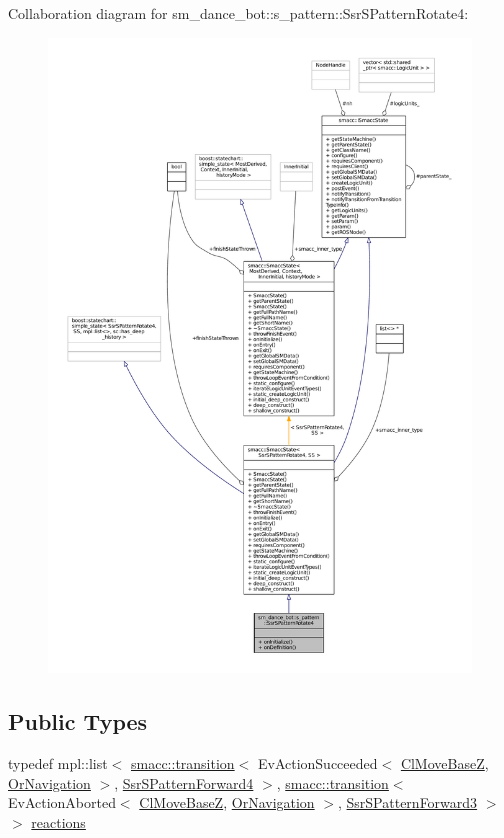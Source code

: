 Collaboration diagram for sm\+\_\+dance\+\_\+bot\+:\+:s\+\_\+pattern\+:\+:Ssr\+S\+Pattern\+Rotate4\+:
\nopagebreak
\begin{figure}[H]
\begin{center}
\leavevmode
\includegraphics[width=350pt]{structsm__dance__bot_1_1s__pattern_1_1SsrSPatternRotate4__coll__graph}
\end{center}
\end{figure}
\subsection*{Public Types}
\begin{DoxyCompactItemize}
\item 
typedef mpl\+::list$<$ \hyperlink{classsmacc_1_1transition}{smacc\+::transition}$<$ Ev\+Action\+Succeeded$<$ \hyperlink{classmove__base__z__client_1_1ClMoveBaseZ}{Cl\+Move\+BaseZ}, \hyperlink{classsm__dance__bot_1_1OrNavigation}{Or\+Navigation} $>$, \hyperlink{structsm__dance__bot_1_1s__pattern_1_1SsrSPatternForward4}{Ssr\+S\+Pattern\+Forward4} $>$, \hyperlink{classsmacc_1_1transition}{smacc\+::transition}$<$ Ev\+Action\+Aborted$<$ \hyperlink{classmove__base__z__client_1_1ClMoveBaseZ}{Cl\+Move\+BaseZ}, \hyperlink{classsm__dance__bot_1_1OrNavigation}{Or\+Navigation} $>$, \hyperlink{structsm__dance__bot_1_1s__pattern_1_1SsrSPatternForward3}{Ssr\+S\+Pattern\+Forward3} $>$ $>$ \hyperlink{structsm__dance__bot_1_1s__pattern_1_1SsrSPatternRotate4_a608f0a7a2bd1ab1b278741e2b8a4ea94}{reactions}
\end{DoxyCompactItemize}
